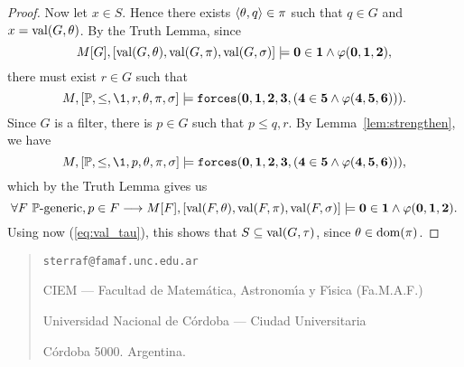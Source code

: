 \documentclass[11pt,english]{article}
\renewcommand{\PP}{\mathbb{P}}
\newcommand{\forceisa}{\mathtt{forces}}
\newcommand{\dB}[1]{\mathbf{#1}}
\DeclareMathOperator{\val}{val}
\begin{document}
\begin{proof}
  Now let $x\in S$. Hence there exists $\langle\theta,q\rangle\in\pi$ such that
  $q\in G$ and $x=\val(G,\th)$. By the  Truth
  Lemma, since 
  \[
  M[G],[\val(G,\th),\val(G,\pi),\val(G,\sig)]\models
  \dB{0}\in\dB{1}\y\phi(\dB{0},\dB{1},\dB{2}),
  \]
  there must exist $r\in G$ such that 
  \[
  M,[\PP,\leq,\1,r,\th,\pi,\sig]\models
  \forceisa(\dB{0},\dB{1},\dB{2},\dB{3},
  (\dB{4}\in\dB{5}\y\phi(\dB{4},\dB{5},\dB{6}))).
  \]
  Since $G$ is a filter, there is $p\in G$ such that $p\leq q, r$.
  By Lemma~\ref{lem:strengthen}, we have
  \[
  M,[\PP,\leq,\1,p,\th,\pi,\sig]\models
  \forceisa(\dB{0},\dB{1},\dB{2},\dB{3},
  (\dB{4}\in\dB{5}\y \phi(\dB{4},\dB{5},\dB{6}))),
  \]
  which by the Truth Lemma gives us
  \[
  \forall F\ \PP\text{-generic}, \\
   p\in F \longrightarrow
  M[F],[\val(F,\th),\val(F,\pi),\val(F,\sig)]\models
  \dB{0}\in \dB{1} \y\phi(\dB{0},\dB{1},\dB{2}).
  \]
  Using now (\ref{eq:val_tau}), this shows that $S\sbq \val(G,\tau)$,
  since $\theta\in\operatorname{dom}(\pi)$. 
\end{proof}





\bigskip

\begin{small}
  \begin{quote}
    \texttt{sterraf@famaf.unc.edu.ar}
    
    CIEM --- Facultad de Matem\'atica, Astronom\'{\i}a y F\'{\i}sica 
    (Fa.M.A.F.) 
    
    Universidad Nacional de C\'ordoba --- Ciudad Universitaria
    
    C\'ordoba 5000. Argentina.
  \end{quote}
\end{small}
\end{document}
